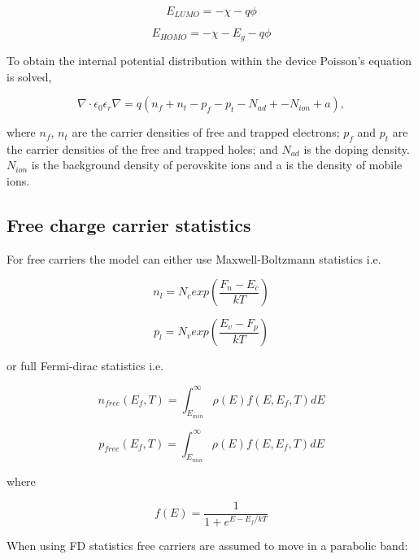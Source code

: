 \begin{equation}
E_{LUMO}=-\chi-q\phi
\end{equation}

\begin{equation}
E_{HOMO}=-\chi-E_g-q\phi
\end{equation}

To obtain the internal potential distribution within the device Poisson's equation is solved,

\begin{equation}
\label{eq:pos}
\nabla \cdot \epsilon_0 \epsilon_r \nabla = q (n_{f}+n_{t}-p_{f}-p_{t}-N_{ad}+-N_{ion}+a),
\end{equation}

where $n_{f}$, $n_{t}$ are the carrier densities of free and trapped electrons; $p_{f}$ and $p_{t}$ are the carrier densities of the free and trapped holes; and $N_{ad}$ is the doping density. $N_{ion}$ is the background density of perovskite ions and a is the density of mobile ions.

\subsection{Free charge carrier statistics}
For free carriers the model can either use Maxwell-Boltzmann statistics i.e.

\begin{equation}
n_{l}=N_c exp \left (\frac{F_n-E_{c}}{kT} \right)
\end{equation}

\begin{equation}
p_{l}=N_v exp \left(\frac{E_{v}-F_p}{kT} \right)
\end{equation}


or full Fermi-dirac statistics i.e.

\begin{equation}
n_{free}(E_{f},T)=\int^{\infty}_{E_{min}} \rho(E) f(E,E_{f},T) dE
\end{equation}

\begin{equation}
p_{free}(E_{f},T)=\int^{\infty}_{E_{min}} \rho(E) f(E,E_{f},T) dE
\end{equation}

where

\begin{equation}
f(E)=\frac{1}{1+e^{{E-E_f}/kT}}
\end{equation}

When using FD statistics free carriers are assumed to move in a parabolic band:

